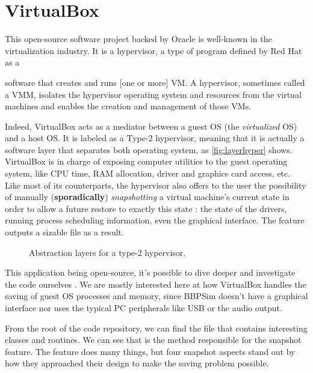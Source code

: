 \section{VirtualBox}\label{sec:virtualbox}
This open-source software project backed by Oracle is well-known in the virtualization industry. It is a hypervisor, a type of program defined by Red Hat as a
\begin{shadedquotation}
	[...] software that creates and runs [one or more] \gls{VM}. A hypervisor, sometimes called a \gls{VMM}, isolates the hypervisor operating system and resources from the virtual machines and enables the creation and management of those VMs.\cite{online:redhat}
\end{shadedquotation}
Indeed, VirtualBox acts as a mediator between a guest OS (the \textit{virtualized} OS) and a host OS. It is labeled as a Type-2 hypervisor, meaning that it is actually a software layer that separates both operating system, as \autoref{fig:layerhyper} shows. VirtualBox is in charge of exposing computer utilities to the guest operating system, like CPU time, RAM allocation, driver and graphics card access, etc. Like most of its counterparts, the hypervisor also offers to the user the possibility of manually (\textbf{sporadically}) \textit{snapshotting} a virtual machine's current state in order to allow a future restore to exactly this state : the state of the drivers, running process scheduling information, even the graphical interface. The feature outputs a sizable file as a result.

\begin{figure}
	\centering \scriptsize
	\vspace{-12pt}
	
	\caption{Abstraction layers for a type-2 hypervisor.}
	\label{fig:layerhyper}
	\vspace{-24pt}
\end{figure}
This application being open-source, it's possible to dive deeper and investigate the code ourselves \cite{online:vboxcode}. We are mostly interested here at how VirtualBox handles the saving of guest OS processes and memory, since BBPSim doesn't have a graphical interface nor uses the typical PC peripherals like USB or the audio output.

From the root of the code repository, we can find the  file that contains interesting \Cpp classes and routines. We can see that  is the method responsible for the snapshot feature. The feature does many things, but four snapshot aspects stand out by how they approached their design to make the saving problem possible.

